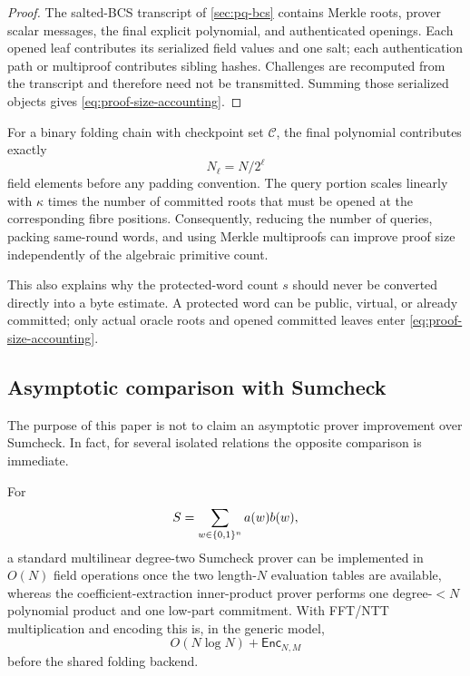 \begin{proof}
The salted-BCS transcript of \cref{sec:pq-bcs} contains Merkle roots, prover scalar messages, the final explicit polynomial, and authenticated openings.  Each opened leaf contributes its serialized field values and one salt; each authentication path or multiproof contributes sibling hashes.  Challenges are recomputed from the transcript and therefore need not be transmitted.  Summing those serialized objects gives \eqref{eq:proof-size-accounting}.
\end{proof}

For a binary folding chain with checkpoint set $\mathcal C$, the final polynomial contributes exactly
\begin{equation}
  N_\ell=N/2^\ell
  \label{eq:final-poly-elements}
\end{equation}
field elements before any padding convention.  The query portion scales linearly with $\kappa$ times the number of committed roots that must be opened at the corresponding fibre positions.  Consequently, reducing the number of queries, packing same-round words, and using Merkle multiproofs can improve proof size independently of the algebraic primitive count.

This also explains why the protected-word count $s$ should never be converted directly into a byte estimate.  A protected word can be public, virtual, or already committed; only actual oracle roots and opened committed leaves enter \eqref{eq:proof-size-accounting}.

\subsection{Asymptotic comparison with Sumcheck}
\label{sec:complexity-vs-sumcheck}

The purpose of this paper is not to claim an asymptotic prover improvement over Sumcheck.  In fact, for several isolated relations the opposite comparison is immediate.

\begin{proposition}
\label{prop:ip-vs-sumcheck-complexity}
For
\[
  S=\sum_{w\in\{0,1\}^n}a(w)b(w),
\]
a standard multilinear degree-two Sumcheck prover can be implemented in $O(N)$ field operations once the two length-$N$ evaluation tables are available, whereas the coefficient-extraction inner-product prover performs one degree-$<N$ polynomial product and one low-part commitment.  With FFT/NTT multiplication and encoding this is, in the generic model,
\begin{equation}
  O(N\log N)+\mathsf{Enc}_{N,M}
  \label{eq:ip-ce-generic-cost}
\end{equation}
before the shared folding backend.
\end{proposition}

